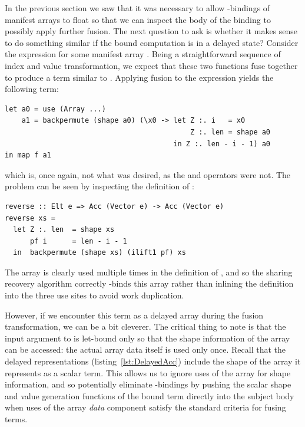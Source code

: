 In the previous section we saw that it was necessary to allow
-bindings of manifest arrays to float so that we can inspect the
body of the binding to possibly apply further fusion. The next question to ask
is whether it makes sense to do something similar if the bound computation is in
a delayed state? Consider the expression  for some
manifest array . Being a straightforward sequence of index and value
transformation, we expect that these two functions fuse together to produce a
term similar to . Applying fusion to the expression yields the
following term:
%
\begin{lstlisting}[style=haskell]
let a0 = use (Array ...)
    a1 = backpermute (shape a0) (\x0 -> let Z :. i   = x0
                                            Z :. len = shape a0
                                        in Z :. len - i - 1) a0
in map f a1
\end{lstlisting}
%
which is, once again, not what was desired, as the  and
 operators were not. The problem can be seen by inspecting
the definition of :
%
\begin{lstlisting}[style=haskell]
reverse :: Elt e => Acc (Vector e) -> Acc (Vector e)
reverse xs =
  let Z :. len  = shape xs
      pf i      = len - i - 1
  in  backpermute (shape xs) (ilift1 pf) xs
\end{lstlisting}
%
The array  is clearly used multiple times in the definition of
, and so the sharing recovery algorithm correctly
-binds this array rather than inlining the definition into the three
use sites to avoid work duplication.

However, if we encounter this term as a delayed array during the fusion
transformation, we can be a bit cleverer. The critical thing to note is that the
input argument to  is let-bound only so that the shape
information of the array can be accessed: the actual array data itself is used
only once. Recall that the delayed representations
(listing~\ref{lst:DelayedAcc}) include the shape of the array it represents as a
scalar term. This allows us to ignore uses of the array for shape information,
and so potentially eliminate -bindings by pushing the scalar shape
and value generation functions of the bound term directly into the subject body
when uses of the array \emph{data} component satisfy the standard criteria for
fusing terms.

